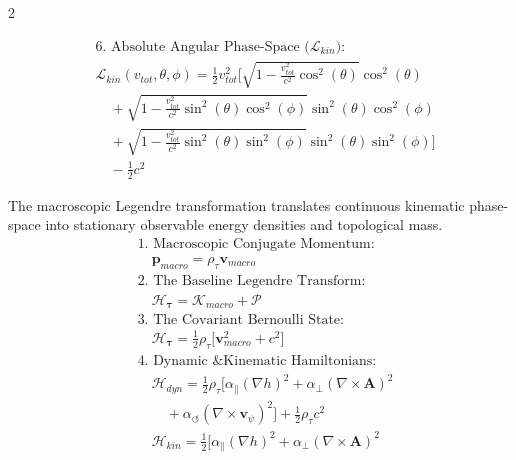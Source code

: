 \documentclass[11pt, a4paper]{article}
\newcounter{cheatnum}
\begin{document}
\begin{multicols}{2}
\begin{tcolorbox}
\begin{align}
    &\text{6. Absolute Angular Phase-Space ($\mathcal{L}_{kin}$):} \nonumber \\
    &\mathcal{L}_{kin}(v_{tot}, \theta, \phi) = \frac{1}{2} v_{tot}^2 \Big[ \sqrt{1 - \frac{v_{tot}^2}{c^2} \cos^2(\theta)} \cos^2(\theta) \nonumber \\
    &\quad + \sqrt{1 - \frac{v_{tot}^2}{c^2} \sin^2(\theta)\cos^2(\phi)} \sin^2(\theta)\cos^2(\phi) \nonumber \\
    &\quad + \sqrt{1 - \frac{v_{tot}^2}{c^2} \sin^2(\theta)\sin^2(\phi)} \sin^2(\theta)\sin^2(\phi) \Big] \nonumber \\
    &\quad - \frac{1}{2} c^2 \label{eq:angular_lagrangian}
\end{align}
\end{tcolorbox}

\begin{tcolorbox}[cheatbox, title={\refstepcounter{cheatnum}\label{box:legendre_hamiltonian}\thecheatnum. The Legendre Hamiltonian Translation \scriptsize\hfill\hyperref[sec:deriv_legendre_hamiltonian]{[Proof $\downarrow$]}}]
The macroscopic Legendre transformation translates continuous kinematic phase-space into stationary observable energy densities and topological mass.
\begin{align}
    &\text{1. Macroscopic Conjugate Momentum:} \nonumber \\
    &\quad \mathbf{p}_{macro} = \rho_{\tau} \mathbf{v}_{macro} \label{eq:conjugate_momentum} \\
    &\text{2. The Baseline Legendre Transform:} \nonumber \\
    &\quad \mathcal{H}_{\boldsymbol{\tau}} = \mathcal{K}_{macro} + \mathcal{P} \label{eq:legendre_transform} \\
    &\text{3. The Covariant Bernoulli State:} \nonumber \\
    &\quad \mathcal{H}_{\boldsymbol{\tau}} = \frac{1}{2} \rho_{\tau} \Big[ \mathbf{v}_{macro}^2 + c^2 \Big] \label{eq:bernoulli_hamiltonian} \\
    &\text{4. Dynamic \& Kinematic Hamiltonians:} \nonumber \\
    &\quad \mathcal{H}_{dyn} = \frac{1}{2} \rho_{\tau} \Big[ \alpha_{\parallel}(\nabla h)^2 + \alpha_{\perp}(\nabla \times \mathbf{A})^2 \nonumber \\
    &\quad \quad + \alpha_{\circlearrowleft}(\nabla \times \mathbf{v}_{\psi})^2 \Big] + \frac{1}{2} \rho_{\tau} c^2 \label{eq:modal_hamiltonian} \\
    &\quad \mathcal{H}_{kin} = \frac{1}{2} \Big[ \alpha_{\parallel}(\nabla h)^2 + \alpha_{\perp}(\nabla \times \mathbf{A})^2 \nonumber \\

\end{align}
\end{tcolorbox}
\end{multicols}
\end{document}
